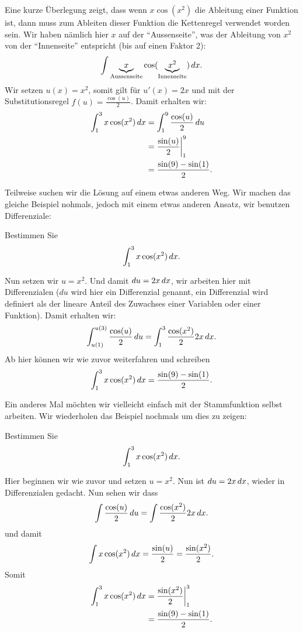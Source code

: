 \begin{solution}
Eine kurze Überlegung zeigt, dass wenn $x\cos(x^2)$ die Ableitung einer Funktion ist, dann muss zum Ableiten dieser Funktion die Kettenregel verwendet worden sein. Wir haben nämlich hier $x$ auf der ``Aussenseite'', was der Ableitung von $x^2$ von der ``Innenseite'' entspricht (bis auf einen Faktor 2):
\[
\int \underbrace{x}_{\text{Aussenseite}}\cos(\underbrace{x^2}_{\text{Innenseite}})\, d x.
\]
Wir setzen $u(x) = x^2$, somit gilt für $u'(x) = 2x$ und mit der Substitutionsregel $f(u) =
\frac{\cos(u)}{2}$. Damit erhalten wir:
\begin{align*}
\int_1^3 x\cos(x^2)\, d x &= \int_1^9 \frac{\cos(u)}{2}\, d u\\
&= \frac{\sin(u)}{2} \bigg|_1^9 \\
&= \frac{\sin(9) -\sin(1)}{2}.
\end{align*}
\end{solution}

Teilweise suchen wir die Lösung auf einem etwas anderen Weg. Wir machen das gleiche Beispiel nohmals, jedoch mit einem etwas anderen Ansatz, wir benutzen Differenziale:


\begin{example}
Bestimmen Sie
\[
\int_1^3 x\cos(x^2)\, d x.
\]
\end{example}
\begin{solution}
Nun setzen wir $u=x^2$. Und damit $du = 2x \, d x$, wir arbeiten hier mit Differenzialen ($du$ wird hier ein Differenzial genannt, ein Differenzial wird definiert als der lineare Anteil des Zuwachses einer Variablen oder einer Funktion). Damit erhalten wir:
\[
\int_{u(1)}^{u(3)} \frac{\cos(u)}{2}\, d u = \int_1^3\frac{\cos(x^2)}{2}2x\, d x.
\]
Ab hier können wir wie zuvor weiterfahren und schreiben
\[
\int_1^3 x\cos(x^2)\, d x= \frac{\sin(9) -\sin(1)}{2}.
\]
\end{solution}

Ein anderes Mal möchten wir vielleicht einfach mit der Stammfunktion selbst arbeiten. Wir wiederholen das Beispiel nochmals um dies zu zeigen:

\begin{example}
Bestimmen Sie
\[
\int_1^3 x\cos(x^2)\, d x.
\]
\end{example}
\begin{solution}
Hier beginnen wir wie zuvor und setzen $u=x^2$. Nun ist $du = 2x \, d x$,
wieder in Differenzialen gedacht. Nun sehen wir dass
\[
\int  \frac{\cos(u)}{2}\, d u = \int \frac{\cos(x^2)}{2}2x\, d x.
\]
und damit 
\[
\int x\cos(x^2)\, d x = \frac{\sin(u)}{2} = \frac{\sin(x^2)}{2}.
\]
Somit
\begin{align*}
\int_1^3 x\cos(x^2)\, d x &=\frac{\sin(x^2)}{2}\bigg|_1^3\\
&= \frac{\sin(9) -\sin(1)}{2}.
\end{align*}
\end{solution}

